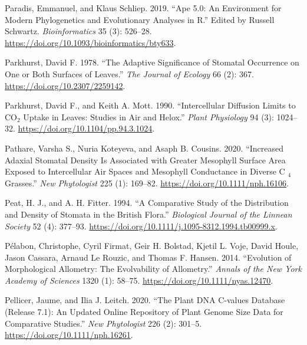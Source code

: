 \documentclass[
  12pt,
]{article}
\newlength{\cslhangindent}
\newlength{\cslentryspacingunit} %
\newenvironment{CSLReferences}[2] %
 {%
  \setlength{\parindent}{0pt}
  \ifodd #1
  \let\oldpar\par
  \def\par{\hangindent=\cslhangindent\oldpar}
  \fi
  \setlength{\parskip}{#2\cslentryspacingunit}
 }%
 {}
\begin{document}
\begin{CSLReferences}{1}{0}
\leavevmode{}%
Paradis, Emmanuel, and Klaus Schliep. 2019. {``Ape 5.0: An Environment for Modern Phylogenetics and Evolutionary Analyses in {R}.''} Edited by Russell Schwartz. \emph{Bioinformatics} 35 (3): 526--28. \url{https://doi.org/10.1093/bioinformatics/bty633}.

\leavevmode{}%
Parkhurst, David F. 1978. {``The Adaptive Significance of Stomatal Occurrence on One or Both Surfaces of Leaves.''} \emph{The Journal of Ecology} 66 (2): 367. \url{https://doi.org/10.2307/2259142}.

\leavevmode{}%
Parkhurst, David F., and Keith A. Mott. 1990. {``Intercellular Diffusion Limits to {CO}\(_{\textrm{2}}\) Uptake in Leaves: Studies in Air and Helox.''} \emph{Plant Physiology} 94 (3): 1024--32. \url{https://doi.org/10.1104/pp.94.3.1024}.

\leavevmode{}%
Pathare, Varsha S., Nuria Koteyeva, and Asaph B. Cousins. 2020. {``Increased Adaxial Stomatal Density Is Associated with Greater Mesophyll Surface Area Exposed to Intercellular Air Spaces and Mesophyll Conductance in Diverse {C} \(_{\textrm{4}}\) Grasses.''} \emph{New Phytologist} 225 (1): 169--82. \url{https://doi.org/10.1111/nph.16106}.

\leavevmode{}%
Peat, H. J., and A. H. Fitter. 1994. {``A Comparative Study of the Distribution and Density of Stomata in the {British} Flora.''} \emph{Biological Journal of the Linnean Society} 52 (4): 377--93. \url{https://doi.org/10.1111/j.1095-8312.1994.tb00999.x}.

\leavevmode{}%
Pélabon, Christophe, Cyril Firmat, Geir H. Bolstad, Kjetil L. Voje, David Houle, Jason Cassara, Arnaud Le Rouzic, and Thomas F. Hansen. 2014. {``Evolution of Morphological Allometry: {The} Evolvability of Allometry.''} \emph{Annals of the New York Academy of Sciences} 1320 (1): 58--75. \url{https://doi.org/10.1111/nyas.12470}.

\leavevmode{}%
Pellicer, Jaume, and Ilia J. Leitch. 2020. {``The {Plant} {DNA} {C}‐values Database (Release 7.1): An Updated Online Repository of Plant Genome Size Data for Comparative Studies.''} \emph{New Phytologist} 226 (2): 301--5. \url{https://doi.org/10.1111/nph.16261}.


\end{CSLReferences}
\end{document}
